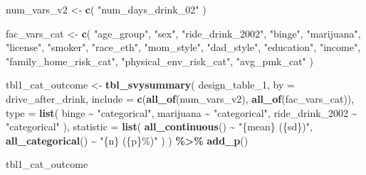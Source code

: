 \documentclass[
]{article}
\newenvironment{Shaded}{\begin{snugshade}}{\end{snugshade}}
\newcommand{\AttributeTok}[1]{\textcolor[rgb]{0.13,0.29,0.53}{#1}}
\newcommand{\FunctionTok}[1]{\textcolor[rgb]{0.13,0.29,0.53}{\textbf{#1}}}
\newcommand{\NormalTok}[1]{#1}
\newcommand{\OtherTok}[1]{\textcolor[rgb]{0.56,0.35,0.01}{#1}}
\newcommand{\SpecialCharTok}[1]{\textcolor[rgb]{0.81,0.36,0.00}{\textbf{#1}}}
\newcommand{\StringTok}[1]{\textcolor[rgb]{0.31,0.60,0.02}{#1}}
\begin{document}
\begin{Shaded}
\begin{Highlighting}[]
\NormalTok{num\_vars\_v2 }\OtherTok{\textless{}{-}} \FunctionTok{c}\NormalTok{(}
  \StringTok{"num\_days\_drink\_02"}
\NormalTok{)}

\NormalTok{fac\_vars\_cat }\OtherTok{\textless{}{-}} \FunctionTok{c}\NormalTok{(}
  \StringTok{"age\_group"}\NormalTok{, }\StringTok{"sex"}\NormalTok{,}
  \StringTok{"ride\_drink\_2002"}\NormalTok{, }\StringTok{"binge"}\NormalTok{, }\StringTok{"marijuana"}\NormalTok{,}
  \StringTok{"license"}\NormalTok{, }\StringTok{"smoker"}\NormalTok{, }\StringTok{"race\_eth"}\NormalTok{, }\StringTok{"mom\_style"}\NormalTok{,}
  \StringTok{"dad\_style"}\NormalTok{, }\StringTok{"education"}\NormalTok{, }\StringTok{"income"}\NormalTok{, }\StringTok{"family\_home\_risk\_cat"}\NormalTok{, }\StringTok{"physical\_env\_risk\_cat"}\NormalTok{,}
  \StringTok{"avg\_pmk\_cat"}
\NormalTok{) }

\NormalTok{tbl1\_cat\_outcome }\OtherTok{\textless{}{-}} \FunctionTok{tbl\_svysummary}\NormalTok{(}
\NormalTok{  design\_table\_1,}
  \AttributeTok{by =}\NormalTok{ drive\_after\_drink,}
  \AttributeTok{include =} \FunctionTok{c}\NormalTok{(}\FunctionTok{all\_of}\NormalTok{(num\_vars\_v2), }\FunctionTok{all\_of}\NormalTok{(fac\_vars\_cat)),}
  \AttributeTok{type =} \FunctionTok{list}\NormalTok{(}
\NormalTok{    binge }\SpecialCharTok{\textasciitilde{}} \StringTok{"categorical"}\NormalTok{,}
\NormalTok{    marijuana }\SpecialCharTok{\textasciitilde{}} \StringTok{"categorical"}\NormalTok{,}
\NormalTok{    ride\_drink\_2002 }\SpecialCharTok{\textasciitilde{}} \StringTok{"categorical"}
\NormalTok{  ),}
  \AttributeTok{statistic =} \FunctionTok{list}\NormalTok{(}
    \FunctionTok{all\_continuous}\NormalTok{() }\SpecialCharTok{\textasciitilde{}} \StringTok{"\{mean\} (\{sd\})"}\NormalTok{,}
    \FunctionTok{all\_categorical}\NormalTok{() }\SpecialCharTok{\textasciitilde{}} \StringTok{"\{n\} (\{p\}\%)"}
\NormalTok{  )}
\NormalTok{) }\SpecialCharTok{\%\textgreater{}\%}
  \FunctionTok{add\_p}\NormalTok{() }

\NormalTok{tbl1\_cat\_outcome}
\end{Highlighting}
\end{Shaded}
\end{document}
